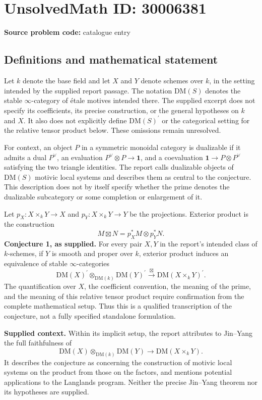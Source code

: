 \documentclass[11pt]{article}
\begin{document}
\section*{UnsolvedMath ID: 30006381}
\textbf{Source problem code:} catalogue entry
\subsection{Definitions and mathematical statement}
Let \(k\) denote the base field and let \(X\) and \(Y\) denote schemes over \(k\), in the setting intended by the supplied report passage. The notation \(\mathrm{DM}(S)\) denotes the stable \(\infty\)-category of étale motives intended there. The supplied excerpt does not specify its coefficients, its precise construction, or the general hypotheses on \(k\) and \(X\). It also does not explicitly define \(\mathrm{DM}(S)^{\prime}\) or the categorical setting for the relative tensor product below. These omissions remain unresolved.

For context, an object \(P\) in a symmetric monoidal category is dualizable if it admits a dual \(P^\vee\), an evaluation \(P^\vee\otimes P\to\mathbf{1}\), and a coevaluation \(\mathbf{1}\to P\otimes P^\vee\) satisfying the two triangle identities. The report calls dualizable objects of \(\mathrm{DM}(S)\) motivic local systems and describes them as central to the conjecture. This description does not by itself specify whether the prime denotes the dualizable subcategory or some completion or enlargement of it.

Let \(p_X:X\times_kY\to X\) and \(p_Y:X\times_kY\to Y\) be the projections. Exterior product is the construction
\[
M\boxtimes N=p_X^*M\otimes p_Y^*N.
\]
\textbf{Conjecture 1, as supplied.} For every pair \(X,Y\) in the report's intended class of \(k\)-schemes, if \(Y\) is smooth and proper over \(k\), exterior product induces an equivalence of stable \(\infty\)-categories
\[
\mathrm{DM}(X)^{\prime}
\otimes_{\mathrm{DM}(k)}
\mathrm{DM}(Y)^{\prime}
\xrightarrow{\ \boxtimes\ }
\mathrm{DM}(X\times_kY)^{\prime}.
\]
The quantification over \(X\), the coefficient convention, the meaning of the prime, and the meaning of this relative tensor product require confirmation from the complete mathematical setup. Thus this is a qualified transcription of the conjecture, not a fully specified standalone formulation.

\textbf{Supplied context.} Within its implicit setup, the report attributes to Jin--Yang the full faithfulness of
\[
\mathrm{DM}(X)\otimes_{\mathrm{DM}(k)}\mathrm{DM}(Y)
\longrightarrow \mathrm{DM}(X\times_kY).
\]
It describes the conjecture as concerning the construction of motivic local systems on the product from those on the factors, and mentions potential applications to the Langlands program. Neither the precise Jin--Yang theorem nor its hypotheses are supplied.
\end{document}
